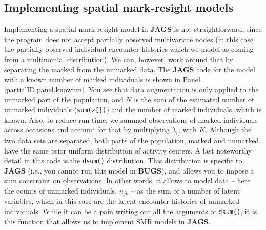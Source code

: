 \subsection{Implementing spatial mark-resight models}
Implementing a spatial mark-resight model in {\bf JAGS} is not
straightforward,
since the program does not accept partially observed
multivariate nodes (in this case the partially observed individual
encounter histories which we model as coming from a multinomial
distribution).
We can, however, work around that by separating the
marked from the unmarked data. The {\bf JAGS} code for the model with
a known number of marked individuals is shown in Panel
\ref{partialID.panel.knownm}. You see that data augmentation is only
applied to the unmarked part of the population, and $N$ is the sum of
the estimated number of unmarked individuals ({\tt sum(z[])}) and the
number of marked individuals, which is known. Also, to reduce run
time, we summed observations of marked individuals across occasions
and account for that by multiplying $\lambda_{ij}$ with $K$. Although
the two data sets are separated, both parts of the population, marked
and unmarked, have the same prior uniform distribution of activity
centers.  A last noteworthy detail in this code is the {\tt dsum()}
distribution.  This distribution is specific to {\bf JAGS} (i.e., you
cannot run this model in {\bf BUGS}), and allows you to
impose a sum constraint on observations.
In other words, it allows to  model data --
here the counts of unmarked individuals, $n_{jk}$ -- as the sum of a
number of latent variables, which in this case are the latent
encounter histories of unmarked individuals. While it can be a pain
writing out all the arguments of {\tt dsum()}, it is this function
that allows us to implement SMR models in {\bf JAGS}.


